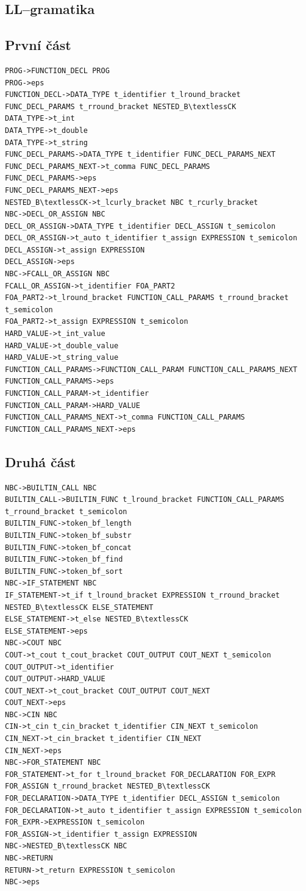 \documentclass[a4paper, 12pt]{article}
\begin{document}
\begin{landscape}
\section{LL--gramatika} \label{llgram}

\subsection{První část}
\begin{verbatim}
PROG->FUNCTION_DECL PROG
PROG->eps
FUNCTION_DECL->DATA_TYPE t_identifier t_lround_bracket FUNC_DECL_PARAMS t_rround_bracket NESTED_B\textlessCK
DATA_TYPE->t_int
DATA_TYPE->t_double
DATA_TYPE->t_string
FUNC_DECL_PARAMS->DATA_TYPE t_identifier FUNC_DECL_PARAMS_NEXT
FUNC_DECL_PARAMS_NEXT->t_comma FUNC_DECL_PARAMS
FUNC_DECL_PARAMS->eps
FUNC_DECL_PARAMS_NEXT->eps
NESTED_B\textlessCK->t_lcurly_bracket NBC t_rcurly_bracket
NBC->DECL_OR_ASSIGN NBC
DECL_OR_ASSIGN->DATA_TYPE t_identifier DECL_ASSIGN t_semicolon
DECL_OR_ASSIGN->t_auto t_identifier t_assign EXPRESSION t_semicolon
DECL_ASSIGN->t_assign EXPRESSION
DECL_ASSIGN->eps
NBC->FCALL_OR_ASSIGN NBC
FCALL_OR_ASSIGN->t_identifier FOA_PART2
FOA_PART2->t_lround_bracket FUNCTION_CALL_PARAMS t_rround_bracket t_semicolon
FOA_PART2->t_assign EXPRESSION t_semicolon
HARD_VALUE->t_int_value
HARD_VALUE->t_double_value
HARD_VALUE->t_string_value
FUNCTION_CALL_PARAMS->FUNCTION_CALL_PARAM FUNCTION_CALL_PARAMS_NEXT
FUNCTION_CALL_PARAMS->eps
FUNCTION_CALL_PARAM->t_identifier
FUNCTION_CALL_PARAM->HARD_VALUE
FUNCTION_CALL_PARAMS_NEXT->t_comma FUNCTION_CALL_PARAMS
FUNCTION_CALL_PARAMS_NEXT->eps
\end{verbatim}
\newpage

\subsection{Druhá část}
\begin{verbatim}
NBC->BUILTIN_CALL NBC
BUILTIN_CALL->BUILTIN_FUNC t_lround_bracket FUNCTION_CALL_PARAMS t_rround_bracket t_semicolon
BUILTIN_FUNC->token_bf_length
BUILTIN_FUNC->token_bf_substr
BUILTIN_FUNC->token_bf_concat
BUILTIN_FUNC->token_bf_find
BUILTIN_FUNC->token_bf_sort
NBC->IF_STATEMENT NBC
IF_STATEMENT->t_if t_lround_bracket EXPRESSION t_rround_bracket NESTED_B\textlessCK ELSE_STATEMENT
ELSE_STATEMENT->t_else NESTED_B\textlessCK
ELSE_STATEMENT->eps
NBC->COUT NBC
COUT->t_cout t_cout_bracket COUT_OUTPUT COUT_NEXT t_semicolon
COUT_OUTPUT->t_identifier
COUT_OUTPUT->HARD_VALUE
COUT_NEXT->t_cout_bracket COUT_OUTPUT COUT_NEXT
COUT_NEXT->eps
NBC->CIN NBC
CIN->t_cin t_cin_bracket t_identifier CIN_NEXT t_semicolon
CIN_NEXT->t_cin_bracket t_identifier CIN_NEXT
CIN_NEXT->eps
NBC->FOR_STATEMENT NBC
FOR_STATEMENT->t_for t_lround_bracket FOR_DECLARATION FOR_EXPR FOR_ASSIGN t_rround_bracket NESTED_B\textlessCK
FOR_DECLARATION->DATA_TYPE t_identifier DECL_ASSIGN t_semicolon
FOR_DECLARATION->t_auto t_identifier t_assign EXPRESSION t_semicolon
FOR_EXPR->EXPRESSION t_semicolon
FOR_ASSIGN->t_identifier t_assign EXPRESSION
NBC->NESTED_B\textlessCK NBC
NBC->RETURN
RETURN->t_return EXPRESSION t_semicolon
NBC->eps
\end{verbatim}
\end{landscape}
\newpage
\end{document}

